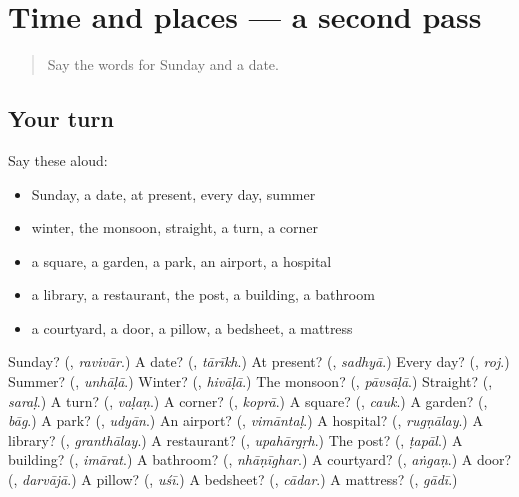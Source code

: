 \section[(dialogue)]{Time and places — a second pass}

\label{lesson:MR-R130-second-pass-time-and-places}



\begin{quote}
Say the words for Sunday and a date.
\end{quote}

\subsection*{Your turn}
Say these aloud:

\begin{itemize}
\raggedright
  \item Sunday, a date, at present, every day, summer
  \item winter, the monsoon, straight, a turn, a corner
  \item a square, a garden, a park, an airport, a hospital
  \item a library, a restaurant, the post, a building, a bathroom
  \item a courtyard, a door, a pillow, a bedsheet, a mattress
\end{itemize}

\begin{tcolorbox}[breakable,colback=teal!4,colframe=teal!35!black,title={Before you move on}]
Sunday? (\textbf{}, \emph{ravivār}.) A date? (\textbf{}, \emph{tārīkh}.) At present? (\textbf{}, \emph{sadhyā}.) Every day? (\textbf{}, \emph{roj}.) Summer? (\textbf{}, \emph{unhāḷā}.) Winter? (\textbf{}, \emph{hivāḷā}.) The monsoon? (\textbf{}, \emph{pāvsāḷā}.) Straight? (\textbf{}, \emph{saraḷ}.) A turn? (\textbf{}, \emph{vaḷaṇ}.) A corner? (\textbf{}, \emph{koprā}.) A square? (\textbf{}, \emph{cauk}.) A garden? (\textbf{}, \emph{bāg}.) A park? (\textbf{}, \emph{udyān}.) An airport? (\textbf{}, \emph{vimāntaḷ}.) A hospital? (\textbf{}, \emph{rugṇālay}.) A library? (\textbf{}, \emph{granthālay}.) A restaurant? (\textbf{}, \emph{upahārgṛh}.) The post? (\textbf{}, \emph{ṭapāl}.) A building? (\textbf{}, \emph{imārat}.) A bathroom? (\textbf{}, \emph{nhāṇīghar}.) A courtyard? (\textbf{}, \emph{aṅgaṇ}.) A door? (\textbf{}, \emph{darvājā}.) A pillow? (\textbf{}, \emph{uśī}.) A bedsheet? (\textbf{}, \emph{cādar}.) A mattress? (\textbf{}, \emph{gādī}.)
\end{tcolorbox}
